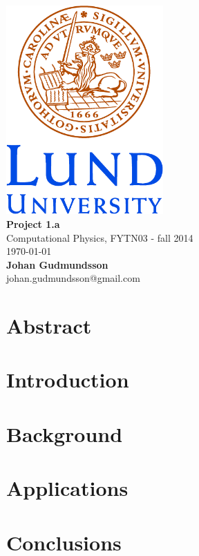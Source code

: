 \documentclass[a4paper,12pt]{article}
\begin{document}
\begin{titlepage}

\begin{center}
\includegraphics[height=8cm]{logocLUeng.eps}
\\[20 mm]
{\large\bf Project 1.a\\[5 mm] }
{Computational Physics, FYTN03 - fall 2014\\[20 mm]}
{\today}\\[20 mm]

{\bf Johan Gudmundsson}
\\
{johan.gudmundsson@gmail.com}

\vfill

\end{center}
\end{titlepage}
\thispagestyle{empty} %
\section*{Abstract}


\phantom{p}
\vfill


\tableofcontents

\section{Introduction}

\phantom{p}
\vfill
\section{Background}

\phantom{p}
\vfill
\section{Applications}

\phantom{p}
\vfill
\section{Conclusions}




\end{document}
